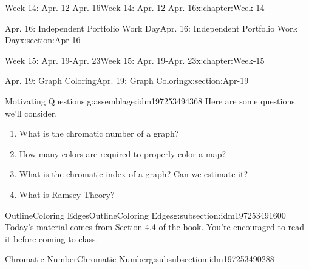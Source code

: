 \documentclass[oneside,10pt,]{book}
\numberwithin{equation}{section}
\begin{document}
\begin{chapterptx}{Week 14: Apr. 12-Apr. 16}{}{Week 14: Apr. 12-Apr. 16}{}{}{x:chapter:Week-14}
%
%
\typeout{************************************************}
\typeout{************************************************}
%
\begin{sectionptx}{Apr. 16: Independent Portfolio Work Day}{}{Apr. 16: Independent Portfolio Work Day}{}{}{x:section:Apr-16}
\end{sectionptx}
\end{chapterptx}
%
%
\typeout{************************************************}
\typeout{************************************************}
%
\begin{chapterptx}{Week 15: Apr. 19-Apr. 23}{}{Week 15: Apr. 19-Apr. 23}{}{}{x:chapter:Week-15}
%
%
\typeout{************************************************}
\typeout{************************************************}
%
\begin{sectionptx}{Apr. 19: Graph Coloring}{}{Apr. 19: Graph Coloring}{}{}{x:section:Apr-19}
\begin{introduction}{}%
\begin{assemblage}{Motivating Questions.}{g:assemblage:idm197253494368}%
Here are some questions we'll consider. %
\begin{enumerate}
\item{}What is the chromatic number of a graph?%
\item{}How many colors are required to properly color a map?%
\item{}What is the chromatic index of a graph? Can we estimate it?%
\item{}What is Ramsey Theory?%
\end{enumerate}
%
\end{assemblage}
\end{introduction}%
%
%
\typeout{************************************************}
\typeout{************************************************}
%
\begin{subsectionptx}{OutlineColoring Edges}{}{OutlineColoring Edges}{}{}{g:subsection:idm197253491600}
Today's material comes from \href{http://discrete.openmathbooks.org/dmoi3/sec_coloring.html}{Section 4.4} of the book. You're encouraged to read it before coming to class.%
%
%
\typeout{************************************************}
\typeout{************************************************}
%
\begin{subsubsectionptx}{Chromatic Number}{}{Chromatic Number}{}{}{g:subsubsection:idm197253490288}

\end{subsubsectionptx}
\end{subsectionptx}
\end{sectionptx}
\end{chapterptx}
\end{document}
